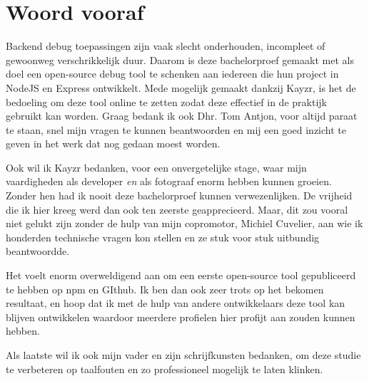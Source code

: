 
\chapter*{Woord vooraf}
\label{ch:voorwoord}


Backend debug toepassingen zijn vaak slecht onderhouden, incompleet of gewoonweg verschrikkelijk duur. Daarom is deze bachelorproef gemaakt met als doel een open-source debug tool te schenken aan iedereen die hun project in NodeJS en Express ontwikkelt. Mede mogelijk gemaakt dankzij Kayzr, is het de bedoeling om deze tool online te zetten zodat deze effectief in de praktijk gebruikt kan worden. Graag bedank ik ook Dhr. Tom Antjon, voor altijd paraat te staan, snel mijn vragen te kunnen beantwoorden en mij een goed inzicht te geven in het werk dat nog gedaan moest worden.

Ook wil ik Kayzr bedanken, voor een onvergetelijke stage, waar mijn vaardigheden als developer \textit{en} als fotograaf enorm hebben kunnen groeien. Zonder hen had ik nooit deze bachelorproef kunnen verwezenlijken. De vrijheid die ik hier kreeg werd dan ook ten zeerste geapprecieerd. Maar, dit zou vooral niet gelukt zijn zonder de hulp van mijn copromotor, Michiel Cuvelier, aan wie ik honderden technische vragen kon stellen en ze stuk voor stuk uitbundig beantwoordde. 

Het voelt enorm overweldigend aan  om een eerste open-source tool gepubliceerd te hebben op npm en GIthub. Ik ben dan ook zeer trots op het bekomen resultaat, en hoop dat ik met de hulp van andere ontwikkelaars deze tool kan blijven ontwikkelen waardoor meerdere profielen hier profijt aan zouden kunnen hebben. 

Als laatste wil ik ook mijn vader en zijn schrijfkunsten bedanken, om deze studie te verbeteren op taalfouten en zo professioneel mogelijk te laten klinken.

